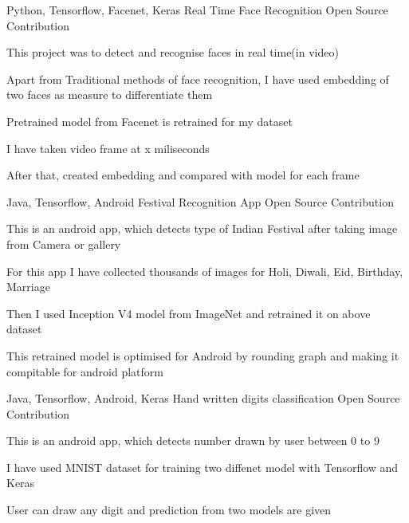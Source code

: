 \begin{cventries}
  \cventry
    {Python, Tensorflow, Facenet, Keras} %
    {Real Time Face Recognition} %
    {Open Source Contribution} %
    {} %
    {
      \begin{cvitems} %
        \item {This project was to detect and recognise faces in real time(in video)}
        \item {Apart from Traditional methods of face recognition, I have used embedding of two faces as measure to differentiate them}
        \item {Pretrained model from Facenet is retrained for my dataset}
        \item {I have taken video frame at x miliseconds}
        \item {After that, created embedding and compared with model for each frame}
      \end{cvitems}
    }

  \cventry
    {Java, Tensorflow, Android} %
    {Festival Recognition App} %
    {Open Source Contribution} %
    {} %
    {
      \begin{cvitems} %
        \item {This is an android app, which detects type of Indian Festival after taking image from Camera or gallery}
        \item {For this app I have collected thousands of images for Holi, Diwali, Eid, Birthday, Marriage}
        \item {Then I used Inception V4 model from ImageNet and retrained it on above dataset}
        \item {This retrained model is optimised for Android by rounding graph and making it compitable for android platform}
      \end{cvitems}
    }

  \cventry
    {Java, Tensorflow, Android, Keras} %
    {Hand written digits classification} %
    {Open Source Contribution} %
    {} %
    {
      \begin{cvitems} %
        \item {This is an android app, which detects number drawn by user between 0 to 9}
        \item {I have used MNIST dataset for training two diffenet model with Tensorflow and Keras }
        \item {User can draw any digit and prediction from two models are given}
      \end{cvitems}
    }


\end{cventries}
